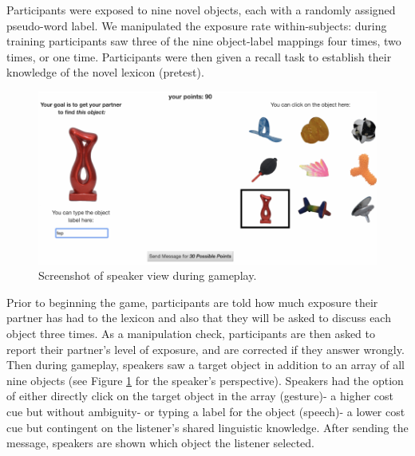\documentclass[10pt, letterpaper]{article}
\newenvironment{CodeChunk}{}{}
\begin{document}
Participants were exposed to nine novel objects, each with a randomly
assigned pseudo-word label. We manipulated the exposure rate
within-subjects: during training participants saw three of the nine
object-label mappings four times, two times, or one time. Participants
were then given a recall task to establish their knowledge of the novel
lexicon (pretest).

\begin{CodeChunk}
\begin{figure}[tb]

{\centering \includegraphics{figs/exp_screenshot-1} 

}

\caption[Screenshot of speaker view during gameplay]{Screenshot of speaker view during gameplay.}\label{fig:exp_screenshot}
\end{figure}
\end{CodeChunk}

Prior to beginning the game, participants are told how much exposure
their partner has had to the lexicon and also that they will be asked to
discuss each object three times. As a manipulation check, participants
are then asked to report their partner's level of exposure, and are
corrected if they answer wrongly. Then during gameplay, speakers saw a
target object in addition to an array of all nine objects (see Figure
\ref{fig:exp_screenshot} for the speaker's perspective). Speakers had
the option of either directly click on the target object in the array
(gesture)- a higher cost cue but without ambiguity- or typing a label
for the object (speech)- a lower cost cue but contingent on the
listener's shared linguistic knowledge. After sending the message,
speakers are shown which object the listener selected.
\end{document}
